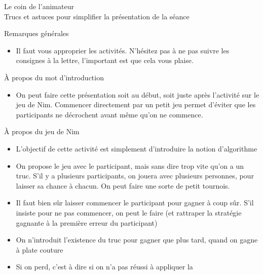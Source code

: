 \documentclass[final,hyperref={pdfpagelabels=false}]{beamer}
\renewcommand*{\large}{\fontsize{\resultlargeX}{\resultlargeY}\selectfont}
\begin{document}
\begin{frame}{Le coin de l'animateur\\[-5pt]
  {\large Trucs et astuces pour simplifier la présentation de la séance}}
  \begin{block}{Remarques générales}
    \begin{itemize}
    \item Il faut vous approprier les activités. N'hésitez pas à ne pas suivre
      les consignes à la lettre, l'important est que cela vous plaise.
    \end{itemize}
  \end{block}
  \begin{block}{À propos du mot d'introduction}
    \begin{itemize}
    \item On peut faire cette présentation soit au début, soit juste après
      l'activité sur le jeu de Nim. Commencer directement par un petit jeu
      permet d'éviter que les participants ne décrochent avant même qu'on ne commence.
    \end{itemize}
  \end{block}
  \begin{block}{À propos du jeu de Nim}
    \begin{itemize}
    \item L'objectif de cette activité est simplement d'introduire la notion d'algorithme
    \item On propose le jeu avec le participant, mais sans dire trop vite qu'on
      a un truc. S'il y a plusieurs participants, on jouera avec plusieurs
      personnes, pour laisser sa chance à chacun. On peut faire une sorte de
      petit tournois.
    \item Il faut bien sûr laisser commencer le participant pour gagner à coup
      sûr. S'il insiste pour ne pas commencer, on peut le faire (et rattraper
      la stratégie gagnante à la première erreur du participant)
    \item On n'introduit l'existence du truc pour gagner que plus tard, quand
      on gagne à plate couture
    \item Si on perd, c'est à dire si on n'a pas réussi à appliquer la

\end{itemize}
\end{block}
\end{frame}
\end{document}
